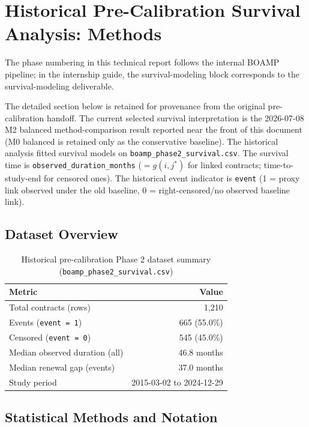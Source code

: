\documentclass[12pt, a4paper]{article}
\begin{document}
\section{Historical Pre-Calibration Survival Analysis: Methods}
\label{sec:phase2}

The phase numbering in this technical report follows the internal BOAMP pipeline;
in the internship guide, the survival-modeling block corresponds to the
survival-modeling deliverable.

The detailed section below is retained for provenance from the original
pre-calibration handoff. The current selected survival interpretation is the
2026-07-08 M2 balanced method-comparison result reported near the front of this
document (M0 balanced is retained only as the conservative baseline). The
historical analysis fitted survival models on
\texttt{boamp\_phase2\_survival.csv}. The survival time is
\texttt{observed\_duration\_months} ($= g(i, j^*)$ for linked contracts;
time-to-study-end for censored ones). The historical event indicator is
\texttt{event} (1 = proxy link observed under the old baseline, 0 =
right-censored/no observed baseline link).

\subsection{Dataset Overview}

\begin{table}[H]
\centering
\caption{Historical pre-calibration Phase 2 dataset summary (\texttt{boamp\_phase2\_survival.csv})}
\begin{tabular}{lr}
\toprule
Metric & Value \\
\midrule
Total contracts (rows)          & 1,210 \\
Events (\texttt{event = 1})     & 665 (55.0\%) \\
Censored (\texttt{event = 0})   & 545 (45.0\%) \\
Median observed duration (all)  & 46.8 months \\
Median renewal gap (events)     & 37.0 months \\
Study period                    & 2015-03-02 to 2024-12-29 \\
\bottomrule
\end{tabular}
\end{table}

\subsection{Statistical Methods and Notation}
\label{sec:phase2_methods}
\end{document}
